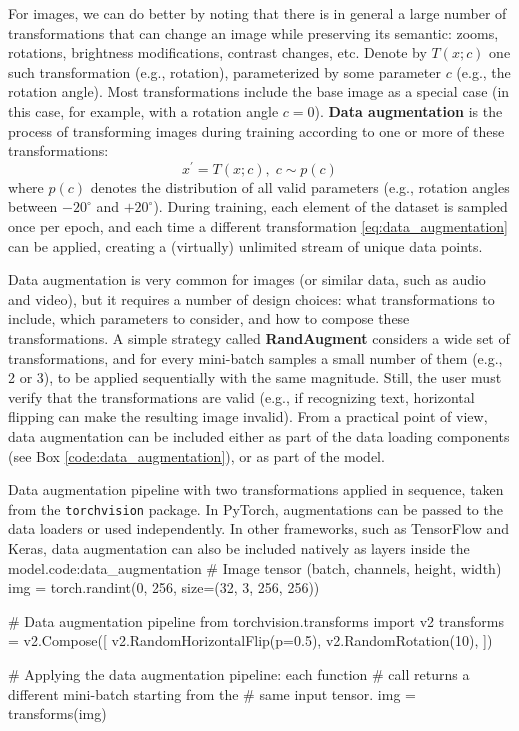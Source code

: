 For images, we can do better by noting that there is in general a large number of transformations that can change an image while preserving its semantic: zooms, rotations, brightness modifications, contrast changes, etc. Denote by $T(x; c)$ one such transformation (e.g., rotation), parameterized by some parameter $c$ (e.g., the rotation angle). Most transformations include the base image as a special case (in this case, for example, with a rotation angle $c=0$). \textbf{Data augmentation} is the process of transforming images during training according to one or more of these transformations:
%
\begin{equation}
x^\prime=T(x;c),\;c\sim p(c)
\label{eq:data_augmentation}
\end{equation}
%
where $p(c)$ denotes the distribution of all valid parameters (e.g., rotation angles between $-20^\circ$ and $+20^\circ$). During training, each element of the dataset is sampled once per epoch, and each time a different transformation \eqref{eq:data_augmentation} can be applied, creating a (virtually) unlimited stream of unique data points.

Data augmentation is very common for images (or similar data, such as audio and video), but it requires a number of design choices: what transformations to include, which parameters to consider, and how to compose these transformations. A simple strategy called \textbf{RandAugment} \cite{cubuk2020randaugment} considers a wide set of transformations, and for every mini-batch samples a small number of them (e.g., 2 or 3), to be applied sequentially with the same magnitude. Still, the user must verify that the transformations are valid (e.g., if recognizing text, horizontal flipping can make the resulting image invalid). From a practical point of view, data augmentation can be included either as part of the data loading components (see Box \ref{code:data_augmentation}), or as part of the model.

\begin{mypy}{Data augmentation pipeline with two transformations applied in sequence, taken from the {\footnotesize\texttt{torchvision}} package. In PyTorch, augmentations can be passed to the data loaders or used independently. In other frameworks, such as TensorFlow and Keras, data augmentation can also be included natively as layers inside the model.}{code:data_augmentation}
# Image tensor (batch, channels, height, width)
img = torch.randint(0, 256, size=(32, 3, 256, 256))

# Data augmentation pipeline
from torchvision.transforms import v2
transforms = v2.Compose([
    v2.RandomHorizontalFlip(p=0.5),
    v2.RandomRotation(10),
])

# Applying the data augmentation pipeline: each function 
# call returns a different mini-batch starting from the 
# same input tensor.
img = transforms(img)
\end{mypy}

